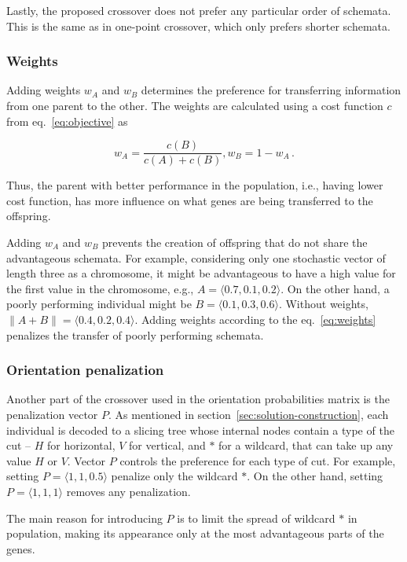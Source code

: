 Lastly, the proposed crossover does not prefer any particular order of schemata.
This is the same as in one-point crossover, which only prefers shorter schemata.


\subsubsection*{Weights}
Adding weights $w_A$ and $w_B$ determines the preference for transferring information from one parent to the other.
The weights are calculated using a cost function $c$ from eq.~\ref{eq:objective} as

\begin{equation}
    w_A = \dfrac{c(B)}{c(A)+{c(B)}}, w_B = 1 - w_A\,.
    \label{eq:weights}
\end{equation}

Thus, the parent with better performance in the population, i.e., having lower cost function,
has more influence on what genes are being transferred to the offspring.

Adding $w_A$ and $w_B$ prevents the creation of offspring that do not share the advantageous schemata.
For example, considering only one stochastic vector of length three as a chromosome,
it might be advantageous to have a high value for the first value in the chromosome, e.g., $A=\langle 0.7, 0.1, 0.2 \rangle$.
On the other hand, a poorly performing individual might be $B=\langle 0.1, 0.3, 0.6 \rangle$.
Without weights, $\| A+B\| = \langle 0.4, 0.2 , 0.4 \rangle$.
Adding weights according to the eq.~\ref{eq:weights} penalizes the transfer of poorly performing schemata.

\subsubsection*{Orientation penalization}

Another part of the crossover used in the orientation probabilities matrix is the penalization vector $P$.
As mentioned in section~\ref{sec:solution-construction}, each individual is decoded to a slicing tree
whose internal nodes contain a type of the cut – $H$ for horizontal, $V$ for vertical, and $*$ for a wildcard, that can take up any value $H$ or $V$.
Vector $P$ controls the preference for each type of cut.
For example, setting $P= \langle 1,1,0.5 \rangle$ penalize only the wildcard $*$.
On the other hand, setting $P= \langle 1,1,1 \rangle$ removes any penalization.

The main reason for introducing $P$ is to limit the spread of wildcard $*$ in population,
making its appearance only at the most advantageous parts of the genes.

